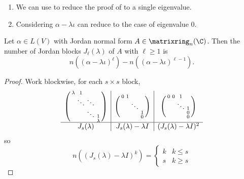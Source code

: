 \documentclass[a4paper]{article}
\newcommand*{\M}{\matrixring}
\theoremstyle{definition}
\begin{document}
\begin{remark}\leavevmode
  \begin{enumerate}
  \item We can use  to reduce the proof of  to a single eigenvalue.
  \item Considering \(\alpha - \lambda \iota\) can reduce to the case of eigenvalue \(0\).
  \end{enumerate}
\end{remark}

\begin{lemma}
  Let \(\alpha \in L(V)\) with Jordan normal form \(A \in \M_n(\C)\). Then the number of Jordan blocks \(J_\ell(\lambda)\) of \(A\) with \(\ell \geq 1\) is
  \[
    n((\alpha - \lambda \iota)^\ell) - n((\alpha - \lambda \iota)^{\ell - 1}).
  \]
\end{lemma}

\begin{proof}
  Work blockwise, for each \(s \times s\) block, 
  \[
    \begin{array}[h]{c|c|c}
      \begin{psmallmatrix}
        \lambda & 1 & & \\
        & \ddots & \ddots & \\
        & & \ddots & 1 \\
        & & & \lambda
      \end{psmallmatrix}
        &
          \begin{psmallmatrix}
            0 & 1 & & \\
            & & \ddots & \\
            & & & 1 \\
            & & & 0
          \end{psmallmatrix}
                 &
                   \begin{psmallmatrix}
                     0 & 0 & 1 & \\
                     & & \ddots & 1 \\
                     & & & 0 \\
                     & & & 0
                   \end{psmallmatrix}
      \\ \hline
      J_s(\lambda) & J_s(\lambda) - \lambda I & (J_s(\lambda) - \lambda I)^2
    \end{array}
  \]
  so
  \[
    n((J_s(\lambda) - \lambda I)^k) =
    \begin{cases}
      k & k \leq s \\
      s & k \geq s
    \end{cases}
  \]
\end{proof}
\end{document}
